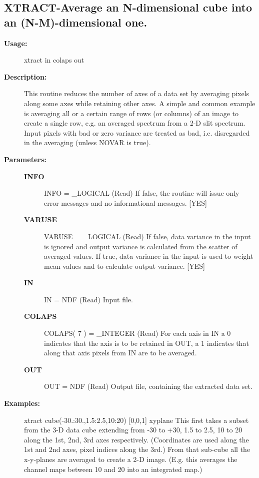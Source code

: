 \subsection{XTRACT-\label{XTRACT}Average an N-dimensional cube into an (N-M)-dimensional one.}
\begin{description}

\item [\textbf{Usage:}]

   xtract in colaps out


\item [\textbf{Description:}]

   This routine reduces the number of axes of a data set by averaging
   pixels along some axes while retaining other axes. A simple and
   common example is averaging all or a certain range of rows (or
   columns) of an image to create a single row, e.g. an averaged
   spectrum from a 2-D slit spectrum. Input pixels with bad or zero
   variance are treated as bad, i.e. disregarded in the averaging
   (unless NOVAR is true).

\item [\textbf{Parameters:}]
\begin{description}
\item [\textbf{INFO}]
INFO = \_LOGICAL (Read)
   If false, the routine will issue only error messages and no
   informational messages. [YES]
\item [\textbf{VARUSE}]
VARUSE = \_LOGICAL (Read)
   If false, data variance in the input is ignored and output
   variance is calculated from the scatter of averaged values.
   If true, data variance in the input is used to weight mean
   values and to calculate output variance. [YES]
\item [\textbf{IN}]
IN = NDF (Read)
   Input file.
\item [\textbf{COLAPS}]
COLAPS( 7 ) = \_INTEGER (Read)
   For each axis in IN a 0 indicates that the axis is to be
   retained in OUT, a 1 indicates that along that axis pixels
   from IN are to be averaged.
\item [\textbf{OUT}]
OUT = NDF (Read)
   Output file, containing the extracted data set.
\end{description}

\item [\textbf{Examples:}]
\begin{terminalv}
xtract cube(-30.:30.,1.5:2.5,10:20) [0,0,1] xyplane
   This first takes a subset from the 3-D data cube extending
   from -30 to +30, 1.5 to 2.5, 10 to 20 along the 1st, 2nd, 3rd
   axes respectively. (Coordinates are used along the 1st and 2nd
   axes, pixel indices along the 3rd.) From that sub-cube all the
   x-y-planes are averaged to create a 2-D image.
   (E.g. this averages the channel maps between 10 and 20 into an
   integrated map.)


\end{terminalv}
\end{description}
